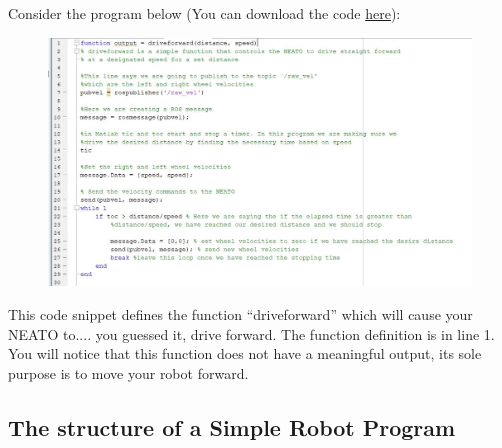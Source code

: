 \documentclass[M3_Night2_Solutions]{subfiles}
\begin{document}
Consider the program below (You can download the code \href{https://drive.google.com/file/d/1sq7yFwfhzcaJakDrcUYzD9HJHjxzhBs8/view?usp=sharing}{here}):

\begin{figure}
\begin{center}
\includegraphics[width=7in]{figs/driveforward.jpg}
\end{center}
\end{figure}

This code snippet defines the function ``driveforward'' which will cause your NEATO to.... you guessed it, drive forward. The function definition is in line 1. You will notice that this function does not have a meaningful output, its sole purpose is to move your robot forward. 

%

\subsection{The structure of a Simple Robot Program}
\end{document}
